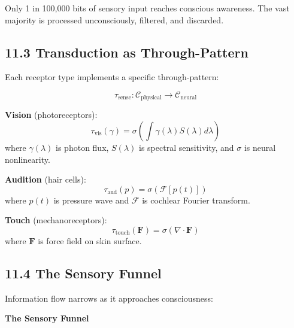 \documentclass[
  11pt,
  letterpaper,
  twoside,
  openany]{book}
\makeatletter
\let\orig@subsection\subsection
\renewcommand{\subsection}{\needspace{6\baselineskip}\orig@subsection}
\makeatother
\begin{document}
\begin{tcolorbox}[enhanced jigsaw, colbacktitle=quarto-callout-important-color!10!white, titlerule=0mm, bottomtitle=1mm, bottomrule=.15mm, colback=white, arc=.35mm, breakable, toprule=.15mm, title=\textcolor{quarto-callout-important-color}{\faExclamation}\hspace{0.5em}{The Consciousness Bottleneck}, rightrule=.15mm, coltitle=black, leftrule=.75mm, colframe=quarto-callout-important-color-frame, toptitle=1mm, opacityback=0, opacitybacktitle=0.6, left=2mm]

Only 1 in 100,000 bits of sensory input reaches conscious awareness. The
vast majority is processed unconsciously, filtered, and discarded.

\end{tcolorbox}

\subsection{11.3 Transduction as
Through-Pattern}\label{transduction-as-through-pattern}

Each receptor type implements a specific through-pattern:

\[\tau_{\text{sense}}: \mathcal{C}_{\text{physical}} \to \mathcal{C}_{\text{neural}}\]

\textbf{Vision} (photoreceptors):
\[\tau_{\text{vis}}(\gamma) = \sigma(\int \gamma(\lambda) S(\lambda) d\lambda)\]
where \(\gamma(\lambda)\) is photon flux, \(S(\lambda)\) is spectral
sensitivity, and \(\sigma\) is neural nonlinearity.

\textbf{Audition} (hair cells):
\[\tau_{\text{aud}}(p) = \sigma(\mathcal{F}[p(t)])\] where \(p(t)\) is
pressure wave and \(\mathcal{F}\) is cochlear Fourier transform.

\textbf{Touch} (mechanoreceptors):
\[\tau_{\text{touch}}(\mathbf{F}) = \sigma(\nabla \cdot \mathbf{F})\]
where \(\mathbf{F}\) is force field on skin surface.

\subsection{11.4 The Sensory Funnel}\label{the-sensory-funnel}

Information flow narrows as it approaches consciousness:

\textbf{The Sensory Funnel}
\end{document}
